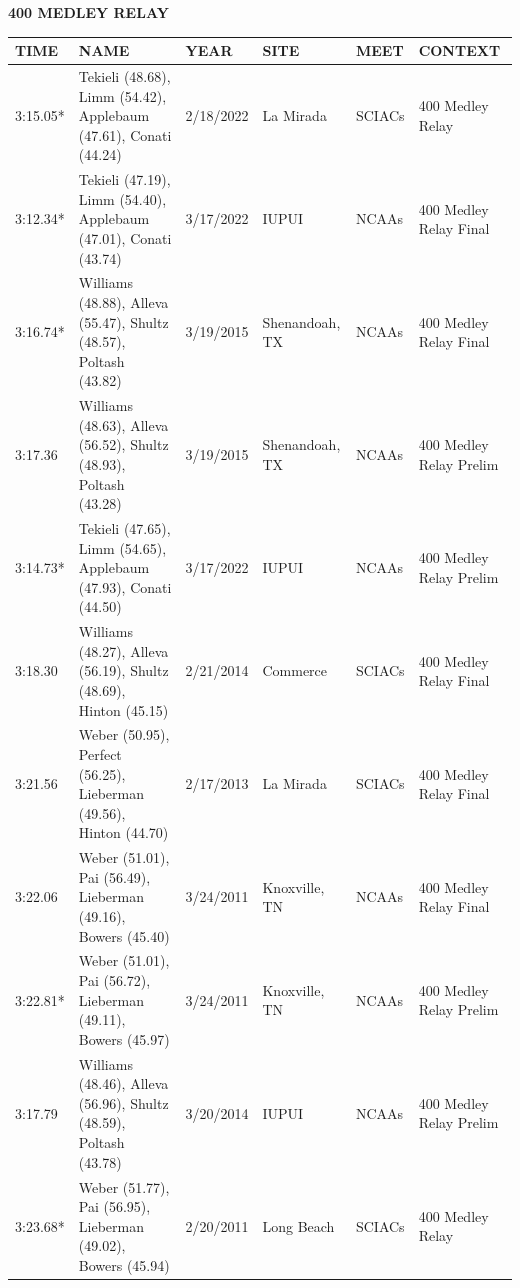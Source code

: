 \begin{table}[H]
\centering
\begin{minipage}[t]{0.6\textwidth}
\centering
\textbf{400 MEDLEY RELAY}\\[0.1cm]
\begin{tabular}{@{}p{1.8cm}p{2.8cm}p{1.2cm}p{1.4cm}p{1.4cm}p{2.0cm}@{}}
\hline
    \textbf{TIME} & \textbf{NAME} & \textbf{YEAR} & \textbf{SITE} & \textbf{MEET} & \textbf{CONTEXT} \\
\hline
    3:15.05* & Tekieli (48.68), Limm (54.42), Applebaum (47.61), Conati (44.24) & 2/18/2022 & La Mirada & SCIACs & 400 Medley Relay \\
    3:12.34* & Tekieli (47.19), Limm (54.40), Applebaum (47.01), Conati (43.74) & 3/17/2022 & IUPUI & NCAAs & 400 Medley Relay Final \\
    3:16.74* & Williams (48.88), Alleva (55.47), Shultz (48.57), Poltash (43.82) & 3/19/2015 & Shenandoah, TX & NCAAs & 400 Medley Relay Final \\
    3:17.36 & Williams (48.63), Alleva (56.52), Shultz (48.93), Poltash (43.28) & 3/19/2015 & Shenandoah, TX & NCAAs & 400 Medley Relay Prelim \\
    3:14.73* & Tekieli (47.65), Limm (54.65), Applebaum (47.93), Conati (44.50) & 3/17/2022 & IUPUI & NCAAs & 400 Medley Relay Prelim \\
    3:18.30 & Williams (48.27), Alleva (56.19), Shultz (48.69), Hinton (45.15) & 2/21/2014 & Commerce & SCIACs & 400 Medley Relay Final \\
    3:21.56 & Weber (50.95), Perfect (56.25), Lieberman (49.56), Hinton (44.70) & 2/17/2013 & La Mirada & SCIACs & 400 Medley Relay Final \\
    3:22.06 & Weber (51.01), Pai (56.49), Lieberman (49.16), Bowers (45.40) & 3/24/2011 & Knoxville, TN & NCAAs & 400 Medley Relay Final \\
    3:22.81* & Weber (51.01), Pai (56.72), Lieberman (49.11), Bowers (45.97) & 3/24/2011 & Knoxville, TN & NCAAs & 400 Medley Relay Prelim \\
    3:17.79 & Williams (48.46), Alleva (56.96), Shultz (48.59), Poltash (43.78) & 3/20/2014 & IUPUI & NCAAs & 400 Medley Relay Prelim \\
    3:23.68* & Weber (51.77), Pai (56.95), Lieberman (49.02), Bowers (45.94) & 2/20/2011 & Long Beach & SCIACs & 400 Medley Relay \\
\hline
\end{tabular}
\end{minipage}
\end{table}


\newpage


